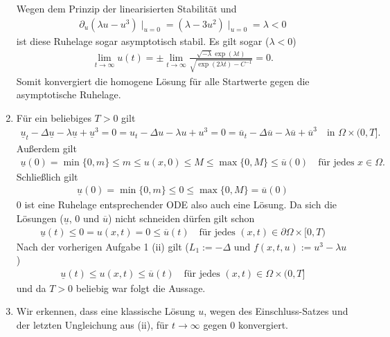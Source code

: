 \begin{solution}
\begin{enumerate}[label = (\roman*)]
		Wegen
    dem Prinzip der linearisierten Stabilität und
    \begin{align*}
			\partial_u (\lambda u - u^3)\mid_{u = 0} = (\lambda - 3 u^2)\mid_{u = 0} = \lambda < 0
		\end{align*}
		ist diese Ruhelage sogar asymptotisch stabil. Es gilt sogar ($\lambda < 0$)
    \begin{align*}
	  \lim_{t \to \infty} u(t)
	  =
	  \pm \lim_{t \to \infty} \frac{\sqrt{- \lambda} \exp(\lambda t)}{\sqrt{\exp(2\lambda t) - C^{-1}}} = 0.
    \end{align*}
    Somit konvergiert die homogene Lösung für alle Startwerte gegen die
    asymptotische Ruhelage.
		\item Für ein beliebiges $T > 0$ gilt
		\begin{align*}
			\underline{u}_t - \Delta \underline{u} - \lambda \underline{u} + \underline{u}^3 = 0 = u_t - \Delta u - \lambda u + u^3 = 0 = \overline{u}_t - \Delta \overline{u} - \lambda \overline{u} + \overline{u}^3 \quad \text{in } \Omega \times (0, T].
		\end{align*}
		Außerdem gilt
		\begin{align*}
			\underline{u}(0) = \min\{0, m\} \leq m \leq u(x, 0) \leq M \leq \max\{0, M\} \leq \overline{u}(0) \quad \text{für jedes } x \in \Omega.
		\end{align*}
		Schließlich gilt
		\begin{align*}
			\underline{u}(0) = \min\{0, m\} \leq 0 \leq \max\{0, M\} = \overline{u}(0)
		\end{align*}
		$0$ ist eine Ruhelage entsprechender ODE also auch eine Lösung.
		Da sich die Lösungen ($\underline{u}$, $0$ und $\overline{u}$) nicht schneiden dürfen gilt schon
		\begin{align*}
			\underline{u}(t) \leq 0 = u(x, t) = 0 \leq \overline{u}(t) \quad \text{für jedes } (x,t) \in \partial\Omega \times [0, T)
		\end{align*}
		Nach der vorherigen Aufgabe 1 (ii) gilt ($L_1 := -\Delta$ und $f(x, t, u) := u^3 - \lambda u$)
		\begin{align*}
			\underline{u}(t) \leq u(x,t) \leq \overline{u}(t) \quad \text{für jedes } (x,t) \in \Omega \times (0, T]
		\end{align*}
		und da $T > 0$ beliebig war folgt die Aussage.
		\item Wir erkennen, dass eine klassische Lösung $u$, wegen des Einschluss-Satzes und der letzten Ungleichung aus (ii), für $t \to \infty$ gegen $0$ konvergiert.
	\end{enumerate}

\end{solution}

